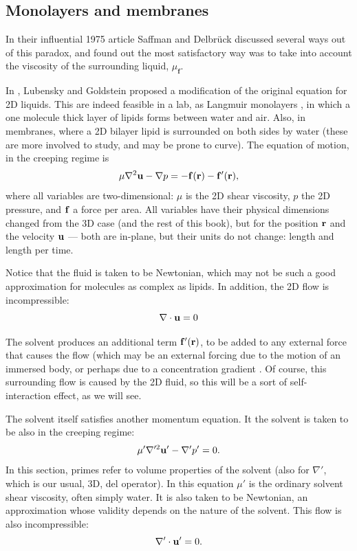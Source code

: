 \subsection{Monolayers and membranes}

In their influential 1975 article Saffman and Delbr{\"u}ck
\cite{saffman1975brownian} discussed several ways out of this paradox,
and found out the most satisfactory way was to take into account the
viscosity of the surrounding liquid, $ \mu_\mathbf{f}$.

In \cite{lubensky1996hydrodynamics}, Lubensky and Goldstein proposed a
modification of the original equation for 2D liquids. This are indeed
feasible in a lab, as Langmuir monolayers ,
in which a one molecule thick layer of lipids forms between water and
air. Also, in membranes, where a 2D bilayer lipid is surrounded on
both sides by water (these are more involved to study, and may be
prone to curve). The equation of motion, in the creeping regime is
\begin{equation}
  \label{eq:Stokes_2D}
  \mu \nabla^2 \mathbf{u} - \nabla p = -\mathbf{f}(\mathbf{r}) -\mathbf{f}'(\mathbf{r}) ,
\end{equation}
%
where all variables are two-dimensional: $\mu$ is the 2D shear
viscosity, $p$ the 2D pressure, and $\mathbf{f}$ a force per area. All
variables have their physical dimensions changed from the 3D case (and
the rest of this book), but for the position $\mathbf{r}$ and the velocity
$\mathbf{u}$ --- both are in-plane, but their units do not change: length
and length per time.

Notice that the fluid is taken to be Newtonian, which may not be such
a good approximation for molecules as complex as lipids.  In addition,
the 2D flow is incompressible:
\[
  \nabla\cdot \mathbf{u} = 0
\]

The solvent produces an additional term $\mathbf{f}'(\mathbf{r}) $, to be added to
any external force that causes the flow (which may be an external
forcing due to the motion of an immersed body, or perhaps due to a
concentration gradient \cite{duque2018}. Of course, this surrounding
flow is caused by the 2D fluid, so this will be a sort of
self-interaction effect, as we will see.

The solvent itself satisfies another momentum equation. It the solvent
is taken to be also in the creeping regime:
\[
  \mu' \nabla'^2 \mathbf{u}' -\nabla' p' = 0 .
\]
In this section, primes refer to volume properties of the solvent
(also for $\nabla'$, which is our usual, 3D, del operator). In this
equation $\mu'$ is the ordinary solvent shear viscosity, often simply
water. It is also taken to be Newtonian, an approximation whose
validity depends on the nature of the solvent. This flow is also
incompressible:
\[
  \nabla'\cdot \mathbf{u}' = 0 .
\]

